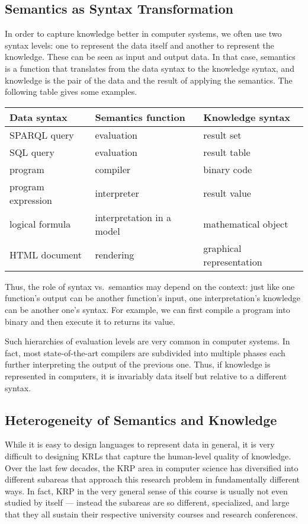 \subsection{Semantics as Syntax Transformation}

In order to capture knowledge better in computer systems, we often use two syntax levels: one to represent the data itself and another to represent the knowledge.
These can be seen as input and output data.
In that case, semantics is a function that translates from the data syntax to the knowledge syntax, and knowledge is the pair of the data and the result of applying the semantics.
The following table gives some examples.

\begin{center}
\begin{tabular}{lll}
\toprule
Data syntax & Semantics function & Knowledge syntax \\
\midrule
SPARQL query & evaluation & result set \\
SQL query & evaluation & result table \\
program & compiler & binary code \\
program expression & interpreter & result value \\ 
logical formula & interpretation in a model & mathematical object \\
HTML document & rendering & graphical representation \\
\bottomrule
\end{tabular}
\end{center}

Thus, the role of syntax vs.\ semantics may depend on the context: just like one function's output can be another function's input, one interpretation's knowledge can be another one's syntax.
For example, we can first compile a program into binary and then execute it to returns its value.

Such hierarchies of evaluation levels are very common in computer systems.
In fact, most state-of-the-art compilers are subdivided into multiple phases each further interpreting the output of the previous one.
Thus, if knowledge is represented in computers, it is invariably data itself but relative to a different syntax.

\subsection{Heterogeneity of Semantics and Knowledge}

While it is easy to design languages to represent data in general, it is very difficult to designing KRLs that capture the human-level quality of knowledge.
Over the last few decades, the KRP area in computer science has diversified into different subareas that approach this research problem in fundamentally different ways.
In fact, KRP in the very general sense of this course is usually not even studied by itself --- instead the subareas are so different, specialized, and large that they all sustain their respective university courses and research conferences.

